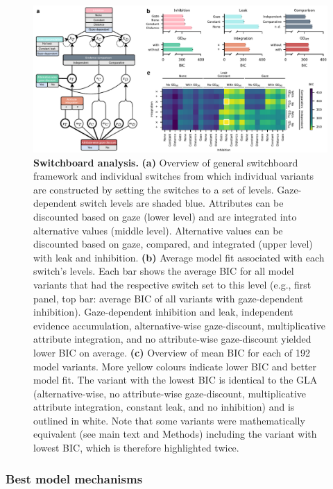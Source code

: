 \documentclass[11pt, a4paper]{article}
\begin{document}
\begin{figure}[t!]
\begin{centering}
\includegraphics[scale=1]{../figures/4-switchboard.pdf}
\caption{\textbf{Switchboard analysis.} \textbf{(a)} Overview of general switchboard framework and individual switches from which individual variants are constructed by setting the switches to a set of levels. Gaze-dependent switch levels are shaded blue. Attributes can be discounted based on gaze (lower level) and are integrated into alternative values (middle level). Alternative values can be discounted based on gaze, compared, and integrated (upper level) with leak and inhibition. \textbf{(b)} Average model fit associated with each switch’s levels. Each bar shows the average BIC for all model variants that had the respective switch set to this level (e.g., first panel, top bar: average BIC of all variants with gaze-dependent inhibition). Gaze-dependent inhibition and leak, independent evidence accumulation, alternative-wise gaze-discount, multiplicative attribute integration, and no attribute-wise gaze-discount yielded lower BIC on average. \textbf{(c)} Overview of mean BIC for each of 192 model variants. More yellow colours indicate lower BIC and better model fit. The variant with the lowest BIC is identical to the GLA (alternative-wise, no attribute-wise gaze-discount, multiplicative attribute integration, constant leak, and no inhibition) and is outlined in white. Note that some variants were mathematically equivalent (see main text and Methods) including the variant with lowest BIC, which is therefore highlighted twice.}
\label{fig:switchboard}
\end{centering}
\end{figure}

\subsubsection*{Best model mechanisms}
\end{document}
